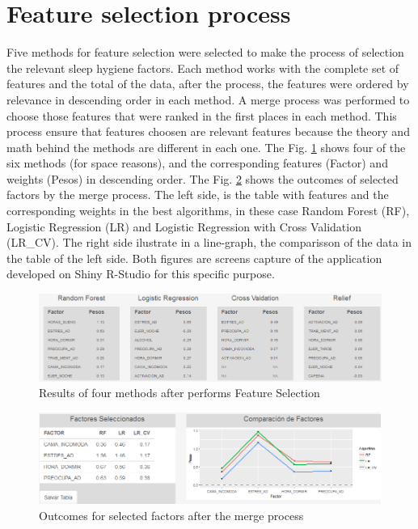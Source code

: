 \documentclass[]{book}
\begin{document}
\section{Feature selection process}\label{feature-selection-process}

Five methods for feature selection were selected to make the process of
selection the relevant sleep hygiene factors. Each method works with the
complete set of features and the total of the data, after the process,
the features were ordered by relevance in descending order in each
method. A merge process was performed to choose those features that were
ranked in the first places in each method. This process ensure that
features choosen are relevant features because the theory and math
behind the methods are different in each one. The Fig.
\ref{fig:four-methods-of-feature-selection} shows four of the six
methods (for space reasons), and the corresponding features (Factor) and
weights (Pesos) in descending order. The Fig. \ref{fig:selected-factors}
shows the outcomes of selected factors by the merge process. The left
side, is the table with features and the corresponding weights in the
best algorithms, in these case Random Forest (RF), Logistic Regression
(LR) and Logistic Regression with Cross Validation (LR\_CV). The right
side ilustrate in a line-graph, the comparisson of the data in the table
of the left side. Both figures are screens capture of the application
developed on Shiny R-Studio for this specific purpose.

\begin{figure}[H]

{\centering \includegraphics[width=0.8\linewidth]{images/four-methods-of-feature-selection} 

}

\caption{Results of four methods after performs Feature Selection}\label{fig:four-methods-of-feature-selection}
\end{figure}

\begin{figure}[H]

{\centering \includegraphics[width=0.8\linewidth]{images/selected-factors} 

}

\caption{Outcomes for selected factors after the merge process}\label{fig:selected-factors}
\end{figure}
\end{document}
